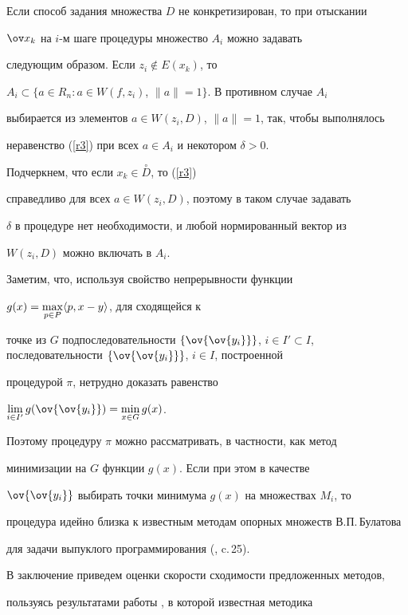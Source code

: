 Если способ задания множества $D$ не конкретизирован, то при отыскании


$\ov x_k$ на $i$-м шаге процедуры множество $A_i$ можно задавать


следующим образом. Если $z_i \notin E(x_k)$, то


$A_i\subset \{a\in R_n: a\in W(f,z_i)$, $\|a\|=1\}$. В противном случае $A_i$


выбирается из элементов $a\in W(z_i,D)$, $\|a\|=1$, так, чтобы выполнялось


неравенство (\ref{r3}) при всех $a\in A_i$ и некотором $\delta>0$.


Подчеркнем, что если $x_k\in \overset{\circ}{D}{}$, то (\ref{r3})


справедливо для всех $a\in W(z_i,D)$, поэтому в таком случае задавать


$\delta$ в процедуре нет необходимости, и любой нормированный вектор из


$W(z_i,D)$ можно включать в $A_i$.





Заметим, что, используя свойство непрерывности функции


$g(x)=\max \limits_{p\in P} \langle p, x-y \rangle $, для сходящейся к


точке из $G$ подпоследовательности $\{\ov{\ov{y_i}}\}$, $i\in I'\subset


I$, последовательности $\{\ov{\ov{y_i}}\}$, $i\in I$, построенной


процедурой $\pi$, нетрудно доказать равенство


$\lim \limits_{i\in I'} g(\ov{\ov{y_i}})= \min \limits_{x\in G} g(x)$.


Поэтому процедуру $\pi$ можно рассматривать, в частности, как метод


минимизации на $G$ функции $g(x)$. Если при этом в качестве


$\ov{\ov{y_i}}$ выбирать точки минимума $g(x)$ на множествах $M_i$, то


процедура идейно близка к известным методам опорных множеств В.П.\,Булатова


для задачи выпуклого программирования (\cite{b4}, c.\,25).





В заключение приведем оценки скорости сходимости предложенных методов,


пользуясь результатами работы \cite{b5}, в которой известная методика


